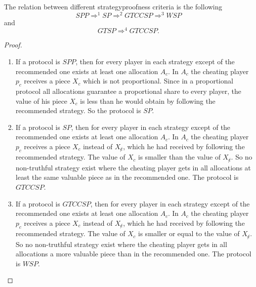 \begin{lem}
\label{thm5} The relation between different strategyproofness criteria is the following $$SPP \Rightarrow^{1} SP \Rightarrow^{2} GTCCSP \Rightarrow^{3} WSP$$ and
$$GTSP \Rightarrow^{4} GTCCSP.$$
\end{lem}
\begin{proof}
\textcolor{white}{x}
\begin{enumerate}
\item If a protocol is $SPP$, then for every player in each strategy except of the recommended one exists at least one allocation $A_c$. In $A_c$ the cheating player $p_c$ receives a piece $X_c$ which is not proportional. Since in a proportional protocol all allocations guarantee a proportional share to every player, the value of his piece $X_c$ is less than he would obtain by following the recommended strategy. So the protocol is $SP$.   
\item If a protocol is $SP$, then for every player in each strategy except of the recommended one exists at least one allocation $A_c$. In $A_c$ the cheating player $p_c$ receives a piece $X_{c}$ instead of $X_{\not c}$, which he had received by following the recommended strategy. The value of $X_c$ is smaller than the value of $X_{\not c}$. So no non-truthful strategy exist where the cheating player gets in all allocations at least the same valuable piece as in the recommended one. The protocol is $GTCCSP$.
\item If a protocol is $GTCCSP$, then for every player in each strategy except of the recommended one exists at least one allocation $A_c$. In $A_c$ the cheating player $p_c$ receives a piece $X_{c}$ instead of $X_{\not c}$, which he had received by following the recommended strategy. The value of $X_c$ is smaller or equal to the value of $X_{\not c}$. So no non-truthful strategy exist where the cheating player gets in all allocations a more valuable piece than in the recommended one. The protocol is $WSP$.

\end{enumerate}
\end{proof}
